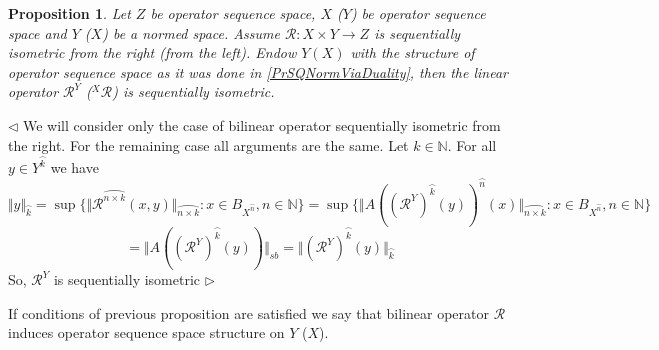 \documentclass[12pt]{article}
\newtheorem{proposition}[theorem]{Proposition}
\newenvironment{proof}{\par $\triangleleft$}{$\triangleright$}
\begin{document}
\begin{proposition}\label{PrFreezIsomSQIsom}
Let $Z$ be operator sequence space, $X$ ($Y$) be operator sequence space and $Y$ ($X$) be a normed space. Assume $\mathcal{R}:X\times Y\to Z$ is sequentially isometric from the right (from the left). Endow $Y(X)$ with the structure of operator sequence space as it was done in \ref{PrSQNormViaDuality}, then the  
linear operator $\mathcal{R}^Y$ (${}^X\mathcal{R}$) is sequentially isometric.
\end{proposition}
\begin{proof}
We will consider only the case of bilinear operator sequentially isometric from the right. For the remaining case all arguments are the same. Let $k\in\mathbb{N}$. For all $y\in Y^{\wideparen{k}}$ we have
$$
\Vert y\Vert_{\wideparen{k}}
=\sup\{\Vert\mathcal{R}^{\wideparen{n\times k}}(x,y)\Vert_{\wideparen{n\times k}}:x\in B_{X^{\wideparen{n}}}, n\in\mathbb{N}\}
=\sup\{\Vert A((\mathcal{R}^Y)^{\wideparen{k}}(y))^{\wideparen{n}}(x)\Vert_{\wideparen{n\times k}}:x\in B_{X^{\wideparen{n}}}, n\in\mathbb{N}\}
$$
$$
=\Vert A((\mathcal{R}^Y)^{\wideparen{k}}(y))\Vert_{sb}
=\Vert (\mathcal{R}^Y)^{\wideparen{k}}(y)\Vert_{\wideparen{k}}
$$
So, $\mathcal{R}^Y$ is sequentially isometric
\end{proof}

If conditions of previous proposition are satisfied we say that bilinear operator $\mathcal{R}$ induces operator sequence space structure on $Y$ ($X$).
\end{document}
